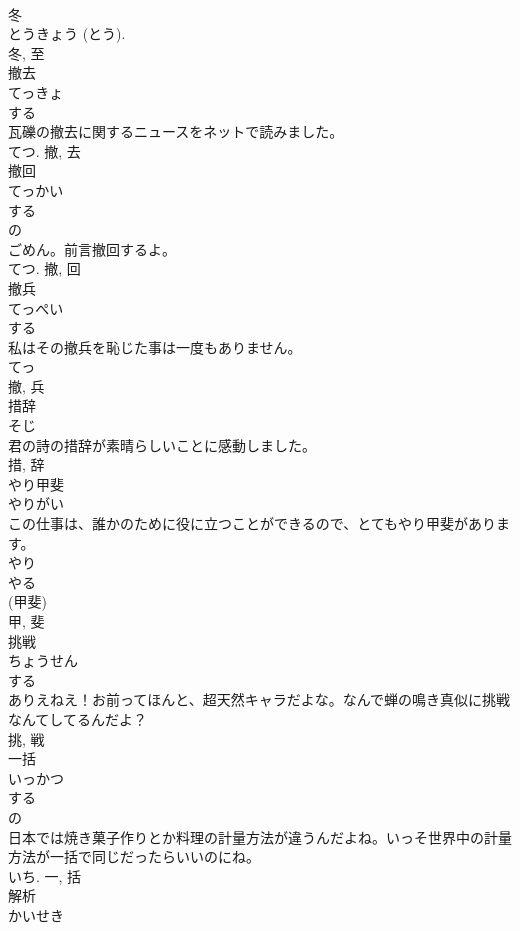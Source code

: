 \documentclass[8pt]{extreport}
\begin{document}
\begin{CJK}{UTF8}{min}
\\	冬 
\\	とうきょう (とう). 
\\	冬, 至	
\\	撤去	
\\	てっきょ	
\\	する 
\\	瓦礫の撤去に関するニュースをネットで読みました。	
\\	てつ.	撤, 去	
\\	撤回	
\\	てっかい	
\\	する 
\\	の 
\\	ごめん。前言撤回するよ。	
\\	てつ.	撤, 回	
\\	撤兵	
\\	てっぺい	
\\	する 
\\	私はその撤兵を恥じた事は一度もありません。	
\\	てっ 
\\	撤, 兵	
\\	措辞	
\\	そじ	
\\	君の詩の措辞が素晴らしいことに感動しました。	
\\	措, 辞	
\\	やり甲斐	
\\	やりがい	
\\	この仕事は、誰かのために役に立つことができるので、とてもやり甲斐があります。	
\\	やり 
\\	やる 
\\	(甲斐) 
\\	甲, 斐	
\\	挑戦	
\\	ちょうせん	
\\	する 
\\	ありえねえ！お前ってほんと、超天然キャラだよな。なんで蝉の鳴き真似に挑戦なんてしてるんだよ？	
\\	挑, 戦	
\\	一括	
\\	いっかつ	
\\	する 
\\	の 
\\	日本では焼き菓子作りとか料理の計量方法が違うんだよね。いっそ世界中の計量方法が一括で同じだったらいいのにね。	
\\	いち.	一, 括	
\\	解析	
\\	かいせき	

\end{CJK}
\end{document}
